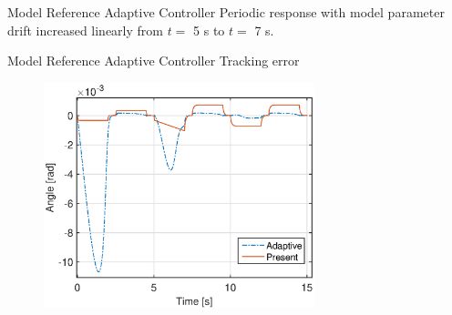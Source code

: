 \documentclass[10pt]{beamer}
\begin{document}
\begin{frame}{Model Reference Adaptive Controller}
  Periodic response with model parameter drift increased linearly from $t=$ 5 s to $t=$ 7 s.
  \begin{figure}[h!]
    \centering %
    \qquad
  \end{figure}
\end{frame}

\begin{frame}{Model Reference Adaptive Controller}
  Tracking error
  \begin{figure}[h!]
    \centering
    \includegraphics[width=0.7\textwidth]{../fig/matlab/modelerrorperiodic_trackingerror.eps}
  \end{figure}
\end{frame}
\end{document}

